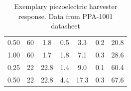 \documentclass[12pt,a4paper]{article}
\begin{document}
\begin{table}[ht!]
\begin{tabular}{|c|c|c|c|c|c|c|}
0.50                                                                                                 & 60                                                                                     & 1.8                                                                                     & 0.5                                                                                    & 3.3                                                                                     & 0.2                                                                                      & 20.8                                                                 \\
1.00                                                                                                 & 60                                                                                     & 1.7                                                                                     & 1.8                                                                                    & 7.1                                                                                     & 0.3                                                                                      & 28.6                                                                 \\ \hline
0.25                                                                                                 & 22                                                                                     & 22.8                                                                                    & 1.4                                                                                    & 9.0                                                                                     & 0.1                                                                                      & 60.4                                                                 \\
0.50                                                                                                 & 22                                                                                     & 22.8                                                                                    & 4.4                                                                                    & 17.3                                                                                    & 0.3                                                                                      & 67.6                                                                 \\ \hline

\end{tabular}
\caption{Exemplary piezoelectric harvester response. Data from PPA-1001 datasheet \cite{PPA}}
\label{tab:ppapower}
\end{table}
\end{document}
